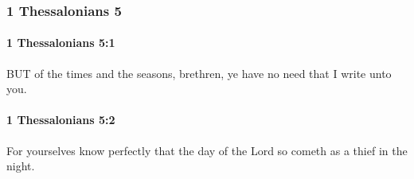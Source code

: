 	\subsubsection{1 Thessalonians 5} %
		\label{1THESSALONIANS-5}
		
		\paragraph{1 Thessalonians 5:1} %
			\label{1THESSALONIANS-5-1}

			BUT of the times and the seasons, brethren, ye have no need that I write unto you.

			\begin{framed}
			\scriptsize
				\begin{compactdesc}
					\item[SBLG] 
				\end{compactdesc}
			\end{framed}

		\paragraph{1 Thessalonians 5:2} %
			\label{1THESSALONIANS-5-2}

			For yourselves know perfectly that the day of the Lord so cometh as a thief in the night.


